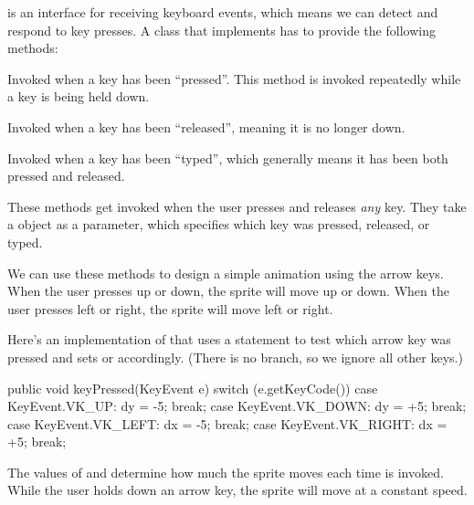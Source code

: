  is an interface for receiving keyboard events, which means we can detect and respond to key presses.
A class that implements  has to provide the following methods:

\begin{description}

\item {}

Invoked when a key has been ``pressed''.
This method is invoked repeatedly while a key is being held down.

\item {}

Invoked when a key has been ``released'', meaning it is no longer down.

\item {}

Invoked when a key has been ``typed'', which generally means it has been both pressed and released.

\end{description}

These methods get invoked when the user presses and releases {\em any} key.
They take a  object as a parameter, which specifies which key was pressed, released, or typed.

We can use these methods to design a simple animation using the arrow keys.
When the user presses up or down, the sprite will move up or down.
When the user presses left or right, the sprite will move left or right.

Here's an implementation of  that uses a  statement to test which arrow key was pressed and sets  or  accordingly.
(There is no  branch, so we ignore all other keys.)

\begin{code}
public void keyPressed(KeyEvent e) {
    switch (e.getKeyCode()) {
        case KeyEvent.VK_UP:
            dy = -5;
            break;
        case KeyEvent.VK_DOWN:
            dy = +5;
            break;
        case KeyEvent.VK_LEFT:
            dx = -5;
            break;
        case KeyEvent.VK_RIGHT:
            dx = +5;
            break;
    }
}
\end{code}

The values of  and  determine how much the sprite moves each time  is invoked.
While the user holds down an arrow key, the sprite will move at a constant speed.

